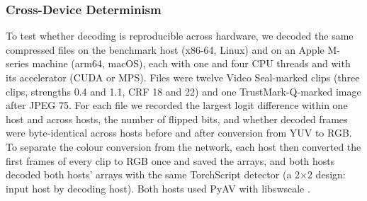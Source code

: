 \subsubsection{Cross-Device Determinism}
To test whether decoding is reproducible across hardware, we decoded the same compressed files on the benchmark host (x86-64, Linux) and on an Apple M-series machine (arm64, macOS), each with one and four CPU threads and with its accelerator (CUDA or MPS). Files were twelve Video Seal-marked clips (three clips, strengths 0.4 and 1.1, CRF 18 and 22) and one TrustMark-Q-marked image after JPEG 75. For each file we recorded the largest logit difference within one host and across hosts, the number of flipped bits, and whether decoded frames were byte-identical across hosts before and after conversion from YUV to RGB. To separate the colour conversion from the network, each host then converted the first  frames of every clip to RGB once and saved the arrays, and both hosts decoded both hosts' arrays with the same TorchScript detector (a 2$\times$2 design: input host by decoding host). Both hosts used PyAV  with libswscale .
